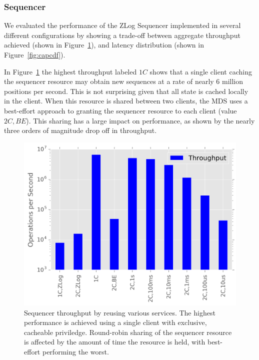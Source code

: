\documentclass[10pt,twocolumn]{article}
\begin{document}
\subsubsection{Sequencer}

We evaluated the performance of the ZLog Sequencer implemented in several
different configurations by showing a trade-off between aggregate throughput
achieved (shown in Figure~\ref{fig:captp}), and latency distribution (shown in
Figure~\ref{fig:capcdf}).

In Figure~\ref{fig:captp} the highest throughput labeled $1C$ shows that a
single client caching the sequencer resource may obtain new sequences at a rate
of nearly 6 million positions per second. This is not surprising given that all
state is cached locally in the client. When this resource is shared between two
clients, the MDS uses a best-effort approach to granting the sequencer resource
to each client (value $2C,BE$). This sharing has a large impact on performance,
as shown by the nearly three orders of magnitude drop off in throughput.

\begin{figure}[h]
\centering
\includegraphics{figures/caps-delay-thruput.png}
\caption{Sequencer throughput by reusing various services.
The highest performance is achieved using a single client with
exclusive, cacheable priviledge. Round-robin sharing of the sequencer
resource is affected by the amount of time the resource is held,
with best-effort performing the worst.}
\label{fig:captp}
\end{figure}
\end{document}
